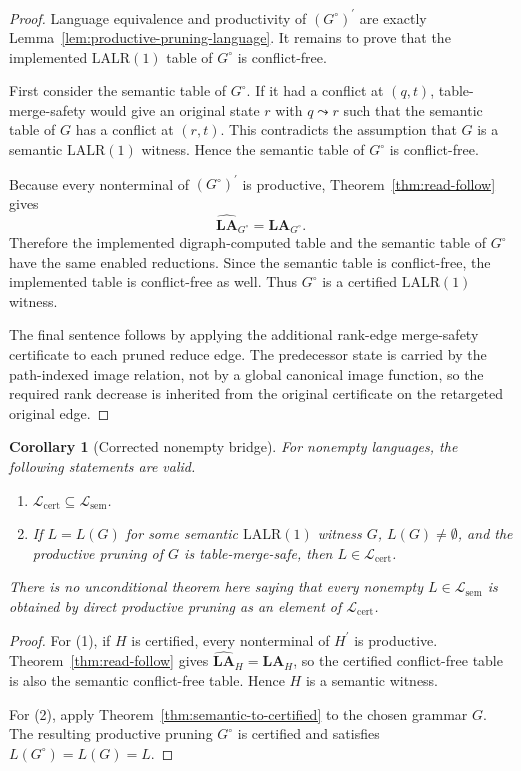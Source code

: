 \documentclass[11pt,a4paper]{article}
\theoremstyle{prettyplain}
\newtheorem{corollary}[theorem]{Corollary}
\theoremstyle{prettydef}
\newcommand{\LALRone}{\mathrm{LALR(1)}}
\newcommand{\Look}{\mathbf{LA}}
\begin{document}
\begin{proof}
Language equivalence and productivity of \((G^\circ)^\prime\) are exactly
Lemma~\ref{lem:productive-pruning-language}.  It remains to prove that the
implemented \(\LALRone\) table of \(G^\circ\) is conflict-free.

First consider the semantic table of \(G^\circ\).  If it had a conflict at
\((q,t)\), table-merge-safety would give an original state \(r\) with
\(q\leadsto r\) such that the semantic table of \(G\) has a conflict at
\((r,t)\).  This contradicts the assumption that \(G\) is a semantic
\(\LALRone\) witness.  Hence the semantic table of \(G^\circ\) is conflict-free.

Because every nonterminal of \((G^\circ)^\prime\) is productive,
Theorem~\ref{thm:read-follow} gives
\[
\widehat{\Look}_{G^\circ}=\Look_{G^\circ}.
\]
Therefore the implemented digraph-computed table and the semantic table of
\(G^\circ\) have the same enabled reductions.  Since the semantic table is
conflict-free, the implemented table is conflict-free as well.  Thus
\(G^\circ\) is a certified \(\LALRone\) witness.

The final sentence follows by applying the additional rank-edge merge-safety
certificate to each pruned reduce edge.  The predecessor state is carried by the
path-indexed image relation, not by a global canonical image function, so the
required rank decrease is inherited from the original certificate on the
retargeted original edge.
\end{proof}

\begin{corollary}[Corrected nonempty bridge]
\label{cor:language-class-equality}
For nonempty languages, the following statements are valid.
\begin{enumerate}
\item \(\mathcal L_{\mathrm{cert}}\subseteq\mathcal L_{\mathrm{sem}}\).
\item If \(L=L(G)\) for some semantic \(\LALRone\) witness \(G\),
\(L(G)\ne\emptyset\), and the productive pruning of \(G\) is table-merge-safe,
then \(L\in\mathcal L_{\mathrm{cert}}\).
\end{enumerate}
There is no unconditional theorem here saying that every nonempty
\(L\in\mathcal L_{\mathrm{sem}}\) is obtained by direct productive pruning as an
element of \(\mathcal L_{\mathrm{cert}}\).
\end{corollary}

\begin{proof}
For (1), if \(H\) is certified, every nonterminal of \(H^\prime\) is productive.
Theorem~\ref{thm:read-follow} gives \(\widehat{\Look}_H=\Look_H\), so the
certified conflict-free table is also the semantic conflict-free table.  Hence
\(H\) is a semantic witness.

For (2), apply Theorem~\ref{thm:semantic-to-certified} to the chosen grammar
\(G\).  The resulting productive pruning \(G^\circ\) is certified and satisfies
\(L(G^\circ)=L(G)=L\).
\end{proof}
\end{document}
